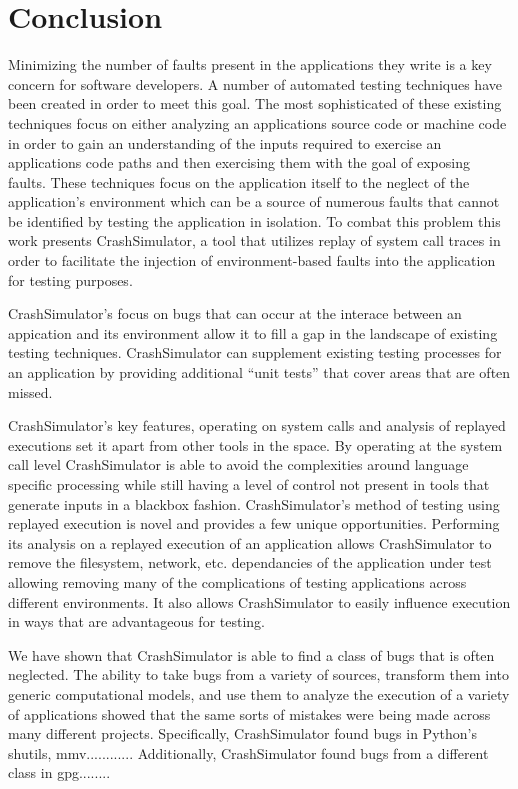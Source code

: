 \section{Conclusion}

Minimizing the number of faults present in the applications they write is a key concern for software developers.  A
number of automated testing techniques have been created in order to meet this goal.  The most sophisticated of these
existing techniques focus on either analyzing an applications source code or machine code in order to gain an
understanding of the inputs required to exercise an applications code paths and then exercising them with the goal of
exposing faults.  These techniques focus on the application itself to the neglect of the application's environment which
can be a source of numerous faults that cannot be identified by testing the application in isolation.  To combat this
problem this work presents CrashSimulator, a tool that utilizes replay of system call traces in order to facilitate the
injection of environment-based faults into the application for testing purposes.

CrashSimulator's focus on bugs that can occur at the interace between an appication and its environment allow it to fill
a gap in the landscape of existing testing techniques.  CrashSimulator can supplement existing testing processes for an
application by providing additional ``unit tests'' that cover areas that are often missed.

CrashSimulator's key features, operating on system calls and analysis of replayed executions set it apart from other
tools in the space.  By operating at the system call level CrashSimulator is able to avoid the complexities around
language specific processing while still having a level of control not present in tools that generate inputs in a
blackbox fashion.  CrashSimulator's method of testing using replayed execution is novel and provides a few unique
opportunities.  Performing its analysis on a replayed execution of an application allows CrashSimulator to remove the
filesystem, network, etc. dependancies of the application under test allowing removing many of the complications of
testing applications across different environments.  It also allows CrashSimulator to easily influence execution in ways
that are advantageous for testing.

We have shown that CrashSimulator is able to find a class of bugs that is often neglected.  The ability to take bugs
from a variety of sources, transform them into generic computational models, and use them to analyze the execution of a
variety of applications showed that the same sorts of mistakes were being made across many different projects.
Specifically, CrashSimulator found bugs in Python's shutils, mmv............ Additionally, CrashSimulator found bugs
from a different class in gpg........

